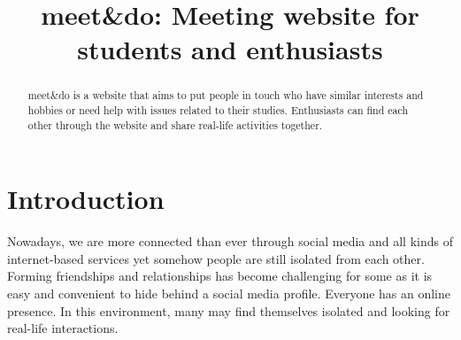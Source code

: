 \documentclass[conference]{IEEEtran}
\begin{document}
\title{meet\&do: Meeting website for students and enthusiasts\\}

\author{
\and
{}
\and
{}
\and
{}
}

\maketitle

\begin{abstract}
meet\&do is a website that aims to put people in touch who have similar interests and hobbies or need help with issues related to their studies. 
Enthusiasts can find each other through the website and share real-life activities together.
\end{abstract}

\section{Introduction}

Nowadays, we are more connected than ever through social media and all kinds of internet-based services yet somehow people are still isolated from each other. 
Forming friendships and relationships has become challenging for some as it is easy and convenient to hide behind a social media profile. 
Everyone has an online presence. 
In this environment, many may find themselves isolated and looking for real-life interactions.
\end{document}
